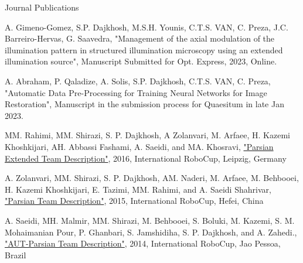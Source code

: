 \begin{cventries}
    
    \cventry
    {} %
    {Journal Publications} %
    {} %
    {} %
    {
      \begin{cvitems} %
        \item{A. Gimeno-Gomez, S.P. Dajkhosh, M.S.H. Younis, C.T.S. VAN, C. Preza, J.C. Barreiro-Hervas, G. Saavedra, "Management of the axial modulation of the illumination pattern in structured illumination microscopy using an extended illumination source", Manuscript Submitted for Opt. Express, 2023, Online.}
        \item{A. Abraham, P. Qaladize, A. Solis, S.P. Dajkhosh, C.T.S. VAN, C. Preza, "Automatic Data Pre-Processing for Training Neural Networks for Image Restoration", Manuscript in the submission process for Quaesitum in late Jan 2023.}
        \item{MM. Rahimi, MM. Shirazi, S. P. Dajkhosh, A Zolanvari, M. Arfaee, H. Kazemi Khoshkijari, AH. Abbassi Fashami, A. Saeidi, and MA. Khosravi, \href{https://sites.google.com/view/steacher/amirkabir-university}{"Parsian Extended Team Description"}, 2016, International RoboCup, Leipzig, Germany}
        \item{A. Zolanvari, MM. Shirazi, S. P. Dajkhosh, AM. Naderi, M. Arfaee, M. Behbooei, H. Kazemi Khoshkijari, E. Tazimi, MM. Rahimi, and A. Saeidi Shahrivar, \href{https://sites.google.com/view/steacher/amirkabir-university}{"Parsian Team Description"}, 2015, International RoboCup, Hefei, China}
        \item{A. Saeidi, MH. Malmir, MM.  Shirazi, M.
        Behbooei, S. Boluki, M. Kazemi, S. M. Mohaimanian Pour, P. Ghanbari, S. Jamshidiha, S. P. Dajkhosh, and A. Zahedi., \href{https://sites.google.com/view/steacher/amirkabir-university}{"AUT-Parsian Team Description"}, 2014, International RoboCup, Jao Pessoa, Brazil}
      \end{cvitems}
    }


\end{cventries}
